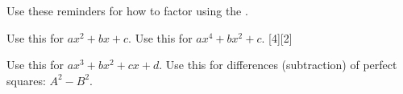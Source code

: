 \documentclass[12pt,letterpaper]{memoir}
\begin{document}
\pagestyle{plain}
\checkandfixthelayout
\raggedbottom


\noindent
{
    \Large
    Use these reminders for how to factor using the 
    .
}

\vfill

\myProblemsWithContent
{
    Use this for {\Large $ax^2 + bx + c$.}
    \tcblower
}
{
    Use this for {\Large $ax^4 + bx^2 + c$.}
    \tcblower
    [4][2]
}

\vfill

\myProblemsWithContent
{
    Use this for {\Large $ax^3 + bx^2 + cx + d$.}
    \tcblower
}
{
    Use this for differences (subtraction) of perfect squares: $A^2 - B^2$.
    \tcblower
    \myDifferenceOfSquaresScaffold
}

\vfill
\end{document}
